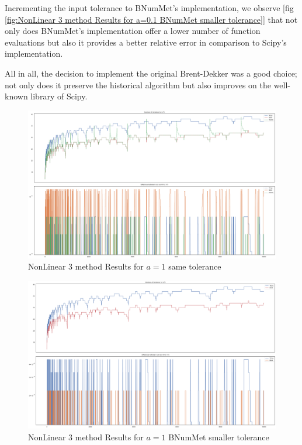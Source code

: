 Incrementing the input tolerance to BNumMet's implementation, we observe [fig \ref{fig:NonLinear 3 method Results for a=0.1 BNumMet smaller tolerance}] that not only does BNumMet's implementation offer a lower number of function evaluations but also it provides a better relative error in comparison to Scipy's implementation.

All in all, the decision to implement the original Brent-Dekker was a good choice; not only does it preserve the historical algorithm but also improves on the well-known library of Scipy.

\begin{figure}
    \centering
    \includegraphics[width=\textwidth]{Include/Images/Thesis/Analysis of Solutions/NonLinear AS/NonLinear 3 method Results a-1.png}
    \caption{NonLinear 3 method Results for $a=1$ same tolerance}
    \label{fig:NonLinear 3 method Results for a=1 same tolerance}
\end{figure}

\begin{figure}
    \centering
    \includegraphics[width=\textwidth]{Include/Images/Thesis/Analysis of Solutions/NonLinear AS/NonLinear 3 method Results Small Tol Bnum a-1.png}
    \caption{NonLinear 3 method Results for $a=1$ BNumMet smaller tolerance}
    \label{fig:NonLinear 3 method Results for a=1 BNumMet smaller tolerance}
\end{figure}

